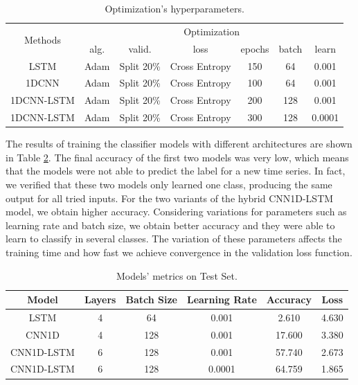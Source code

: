 \begin{table}[h]
	\centering
	\small
	\begin{tabular}{|c|c|c|c|c|c|c|}
		\hline
		\multirow{2}{*}{Methods} & \multicolumn{6}{c|}{Optimization} \\
		\cline{2-7}
		& alg. & valid. & loss & epochs & batch & learn \\
		\cline{2-7}
		\hline
		LSTM & Adam & Split 20\% & Cross Entropy & 150 & 64 & 0.001 \\
		\hline
		1DCNN & Adam & Split 20\% & Cross Entropy & 100 & 64 & 0.001 \\
		\hline
		1DCNN-LSTM & Adam & Split 20\% & Cross Entropy & 200 & 128 & 0.001 \\
		\hline
		1DCNN-LSTM & Adam & Split 20\% & Cross Entropy & 300 & 128 & 0.0001 \\
		\hline
	\end{tabular}
	\caption{Optimization’s hyperparameters.}
	\label{Table:OptimizationNN}
\end{table}

The results of training the classifier models with different architectures are shown in Table \ref{Table:DLModels}. The final accuracy of the first two models was very low, which means that the models were not able to predict the label for a new time series. In fact, we verified that these two models only learned one class, producing the same output for all tried inputs. For the two variants of the hybrid CNN1D-LSTM model, we obtain higher accuracy. Considering variations for parameters such as learning rate and batch size, we obtain better accuracy and they were able to learn to classify in several classes. The variation of these parameters affects the training time and how fast we achieve convergence in the validation loss function. 

\begin{table}[h]
	\centering
	\small
	\begin{tabular}{|c|c|c|c|c|c|}
		\hline
		Model        & Layers & Batch Size & Learning Rate & Accuracy & Loss \\ \hline
		LSTM         & 4      &  64        & 0.001         &  2.610   & 4.630           \\
		CNN1D        & 4      & 128        & 0.001         & 17.600   & 3.380           \\
		CNN1D-LSTM  & 6      & 128        & 0.001         & 57.740   & 2.673           \\ 		
		CNN1D-LSTM  & 6      & 128        & 0.0001		   & 64.759   & 1.865           \\ \hline		
	\end{tabular}
\caption{Models' metrics on Test Set.}
\label{Table:DLModels}
\end{table}

